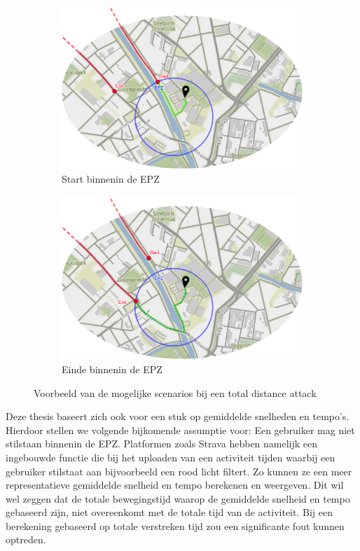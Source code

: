 \begin{figure}[h]
    \centering
    \begin{subfigure}[b]{.5\textwidth}
        \centering
        \caption{Start binnenin de \ac{EPZ}}
        \includegraphics[width=1\textwidth]{fig/TotalDistanceAttacks/start.png}
    \end{subfigure}\hfill
    \begin{subfigure}[b]{.5\textwidth}
        \centering
        \caption{Einde binnenin de \ac{EPZ}}
        \includegraphics[width=1\textwidth]{fig/TotalDistanceAttacks/end.png}
    \end{subfigure}
    \caption{Voorbeeld van de mogelijke scenarios bij een total distance attack}\label{fig:totalDistanceAttack}
\end{figure}

Deze thesis baseert zich ook voor een stuk op gemiddelde snelheden en tempo's.
Hierdoor stellen we volgende bijkomende assumptie voor: Een gebruiker mag niet
stilstaan binnenin de \ac{EPZ}. Platformen zoals Strava hebben namelijk een
ingebouwde functie die bij het uploaden van een activiteit tijden waarbij een
gebruiker stilstaat aan bijvoorbeeld een rood licht filtert. Zo kunnen ze een
meer representatieve gemiddelde snelheid en tempo berekenen en weergeven. Dit
wil wel zeggen dat de totale bewegingstijd waarop de gemiddelde snelheid en
tempo gebaseerd zijn, niet overeenkomt met de totale tijd van de activiteit.
Bij een berekening gebaseerd op totale verstreken tijd zou een significante
fout kunnen optreden.

